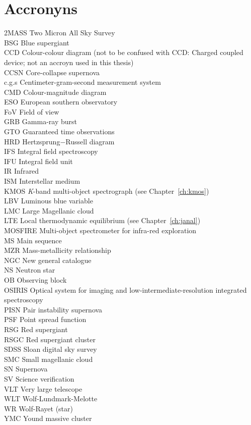 \chapter{Accronyns}\label{ch:acc}
2MASS Two Micron All Sky Survey\\
BSG Blue supergiant\\
CCD Colour-colour diagram (not to be confused with CCD: Charged coupled device; not an accroyn used in this thesis)\\
CCSN Core-collapse supernova\\
c.g.s Centimeter-gram-second measurement system\\
CMD Colour-magnitude diagram\\
ESO European southern observatory\\
FoV Field of view\\
GRB Gamma-ray burst\\
GTO Guaranteed time observations\\
HRD Hertzsprung$-$Russell diagram\\
IFS Integral field spectroscopy\\
IFU Integral field unit\\
IR Infrared\\
ISM Interstellar medium\\
KMOS {\it K}-band multi-object spectrograph (see Chapter~\ref{ch:kmos})\\
LBV Luminous blue variable\\
LMC Large Magellanic cloud\\
LTE Local thermodynamic equilibrium (see Chapter~\ref{ch:janal})\\
MOSFIRE Multi-object spectrometer for infra-red exploration\\
MS Main sequence\\
MZR Mass-metallicity relationship\\
NGC New general catalogue\\
NS Neutron star\\
OB Observing block\\
OSIRIS Optical system for imaging and low-intermediate-resolution integrated spectroscopy\\
PISN Pair instability supernova\\
PSF Point spread function\\
RSG Red supergiant\\
RSGC Red supergiant cluster\\
SDSS Sloan digital sky survey\\
SMC Small magellanic cloud\\
SN Supernova\\
SV Science verification\\
VLT Very large telescope\\
WLT Wolf-Lundmark-Melotte\\
WR Wolf-Rayet (star)\\
YMC Yound massive cluster\\
